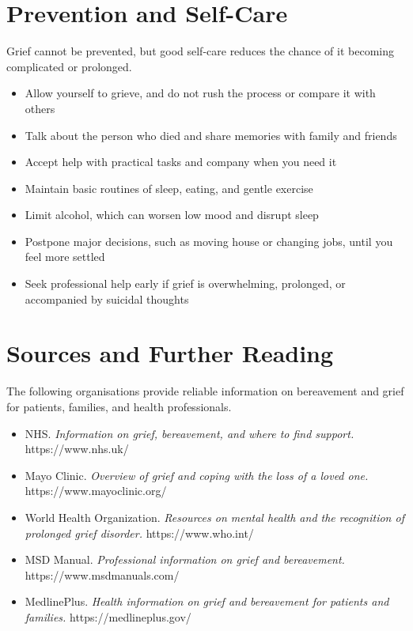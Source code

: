 \section*{Prevention and Self-Care}
Grief cannot be prevented, but good self-care reduces the chance of it becoming complicated or prolonged.

\begin{itemize}
    \item Allow yourself to grieve, and do not rush the process or compare it with others
    \item Talk about the person who died and share memories with family and friends
    \item Accept help with practical tasks and company when you need it
    \item Maintain basic routines of sleep, eating, and gentle exercise
    \item Limit alcohol, which can worsen low mood and disrupt sleep
    \item Postpone major decisions, such as moving house or changing jobs, until you feel more settled
    \item Seek professional help early if grief is overwhelming, prolonged, or accompanied by suicidal thoughts
\end{itemize}

\section*{Sources and Further Reading}
The following organisations provide reliable information on bereavement and grief for patients, families, and health professionals.

\begin{itemize}
    \item NHS. \textit{Information on grief, bereavement, and where to find support.} https://www.nhs.uk/
    \item Mayo Clinic. \textit{Overview of grief and coping with the loss of a loved one.} https://www.mayoclinic.org/
    \item World Health Organization. \textit{Resources on mental health and the recognition of prolonged grief disorder.} https://www.who.int/
    \item MSD Manual. \textit{Professional information on grief and bereavement.} https://www.msdmanuals.com/
    \item MedlinePlus. \textit{Health information on grief and bereavement for patients and families.} https://medlineplus.gov/
\end{itemize}
